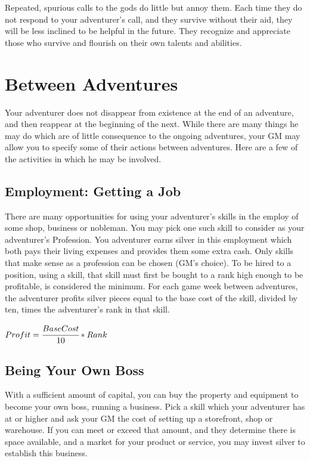\begin{multicols}{2}
Repeated, spurious calls to the gods do little but annoy them. Each time they do not respond to your adventurer's call, and they survive without their aid, they will be less inclined to be helpful in the future. They recognize and appreciate those who survive and flourish on their own talents and abilities.
\section{Between Adventures}
Your adventurer does not disappear from existence at the end of an adventure, and then reappear at the beginning of the next. While there are many things he may do which are of little consequence to the ongoing adventures, your GM may allow you to specify some of their actions between adventures. Here are a few of the activities in which he may be involved.
\subsection{Employment: Getting a Job}
There are many opportunities for using your adventurer's skills in the employ of some shop, business or nobleman. You may pick one such skill to consider as your adventurer's Profession. You adventurer earns silver in this employment which both pays their living expenses and provides them some extra cash. Only skills that make sense as a profession can be chosen (GM's choice). To be hired to a position, using a skill, that skill must first be bought to a rank high enough to be profitable,  is considered the minimum. For each game week between adventures, the adventurer profits silver pieces equal to the base cost of the skill, divided by ten, times the adventurer's rank in that skill.
\begin{normboxc}
\large
$Profit = \cfrac{Base Cost}{10} * Rank$
\end{normboxc}
\subsection{Being Your Own Boss}
With a sufficient amount of capital, you can buy the property and equipment to become your own boss, running a business. Pick a skill which your adventurer has at  or higher and ask your GM the cost of setting up a storefront, shop or warehouse. If you can meet or exceed that amount, and they determine there is space available, and a market for your product or service, you may invest silver to establish this business.


\end{multicols}
